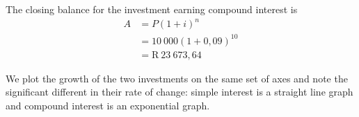 The closing balance for the investment earning compound interest is
\begin{align*}
    A &= P(1 + i)^n\\
      &= 10~000(1 + 0,09)^{10}\\
      &= \mbox{R}~23~673,64
\end{align*}

We plot the growth of the two investments on the same set of axes and note the significant different in their rate of change: simple interest is a straight line graph and compound interest is an exponential graph.

\begin{figure}[H]
    \begin{center}
      \\
	\label{FG:fig:SI10}
    \end{center}
\end{figure}


